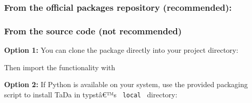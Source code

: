 \subsubsection{From the official packages repository
(recommended):}\label{from-the-official-packages-repository-recommended}

\begin{Shaded}
\begin{Highlighting}[]
\end{Highlighting}
\end{Shaded}

\subsubsection{From the source code (not
recommended)}\label{from-the-source-code-not-recommended}

\textbf{Option 1:} You can clone the package directly into your project
directory:

\begin{Shaded}
\begin{Highlighting}[]
\end{Highlighting}
\end{Shaded}

Then import the functionality with

\begin{Shaded}
\begin{Highlighting}[]
\end{Highlighting}
\end{Shaded}

\textbf{Option 2:} If Python is available on your system, use the
provided packaging script to install TaDa in typstâ€™s
\texttt{\ local\ } directory:

\begin{Shaded}
\begin{Highlighting}[]
  
   \DataTypeTok{\textbackslash{}}
  
\end{Highlighting}
\end{Shaded}

